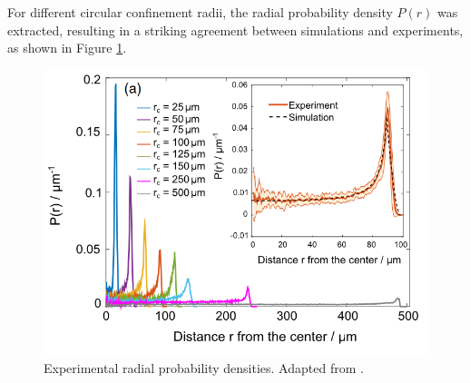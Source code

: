 \documentclass[../../master_thesis_np.tex]{subfiles}
\begin{document}
	For different circular confinement radii, the radial probability density $P(r)$ was extracted, resulting in a striking agreement between simulations and experiments, as shown in Figure \ref{fig:ostapenko1}.
	\begin{figure}[htp]
		\centering
		\includegraphics[width=\singfigwidth]{ostapenko1.png}
		\caption{Experimental radial probability densities. Adapted from \cite{ostapenko_curvature-guided_2018}.}
		\label{fig:ostapenko1}
	\end{figure}
	
\end{document}
